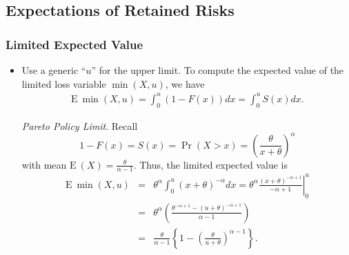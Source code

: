 \documentclass{beamer}
\begin{document}
\subsection{Expectations of Retained Risks}

\begin{frame}[shrink=2]
\frametitle{Limited Expected Value}
\begin{itemize}
\item Use a generic ``$u$'' for the upper limit. To compute the expected value of the limited loss variable $\min(X, u)$, we have
\begin{eqnarray*}
\mathrm{E~}\min(X, u) = \int_0^u \left(1-F(x)\right) dx =  \int_0^u S(x)dx .
\end{eqnarray*}

\textit{Pareto Policy Limit}. Recall
\begin{equation*}
1-F(x)=  S(x) = \Pr(X > x) = \left(\frac{\theta}{x + \theta}\right)^{\alpha}
\end{equation*}
with mean $\mathrm{E~}(X) = \frac{\theta}{\alpha - 1}$. Thus, the limited expected value is
\begin{eqnarray*}
\mathrm{E~}\min(X, u)  &=& \theta^{\alpha}\int_0^u (x + \theta)^{-\alpha} dx =\theta^{\alpha} \left.\frac{(x + \theta)^{-\alpha+1}}{-\alpha + 1}\right|_0^u\\
&=& \theta^{\alpha}\left(\frac{\theta^{-\alpha+1} - (u+\theta)^{-\alpha+1}}{\alpha - 1}\right)\\
&=& \frac{\theta}{\alpha-1}\left\{1 - \left(\frac{\theta}{u + \theta}\right)^{\alpha-1} \right\}.
\end{eqnarray*}
\end{itemize}
\end{frame}
\end{document}
